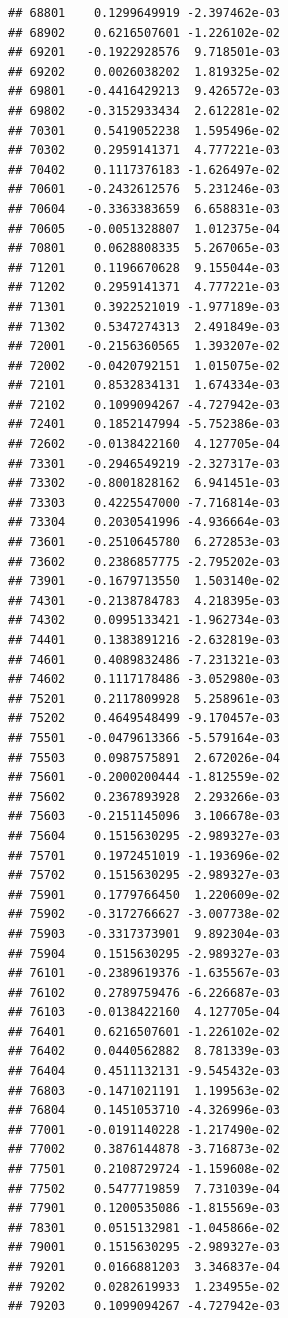 \documentclass[ignorenonframetext,]{beamer}
\begin{document}
\begin{frame}[fragile]
\begin{verbatim}
## 68801    0.1299649919 -2.397462e-03
## 68902    0.6216507601 -1.226102e-02
## 69201   -0.1922928576  9.718501e-03
## 69202    0.0026038202  1.819325e-02
## 69801   -0.4416429213  9.426572e-03
## 69802   -0.3152933434  2.612281e-02
## 70301    0.5419052238  1.595496e-02
## 70302    0.2959141371  4.777221e-03
## 70402    0.1117376183 -1.626497e-02
## 70601   -0.2432612576  5.231246e-03
## 70604   -0.3363383659  6.658831e-03
## 70605   -0.0051328807  1.012375e-04
## 70801    0.0628808335  5.267065e-03
## 71201    0.1196670628  9.155044e-03
## 71202    0.2959141371  4.777221e-03
## 71301    0.3922521019 -1.977189e-03
## 71302    0.5347274313  2.491849e-03
## 72001   -0.2156360565  1.393207e-02
## 72002   -0.0420792151  1.015075e-02
## 72101    0.8532834131  1.674334e-03
## 72102    0.1099094267 -4.727942e-03
## 72401    0.1852147994 -5.752386e-03
## 72602   -0.0138422160  4.127705e-04
## 73301   -0.2946549219 -2.327317e-03
## 73302   -0.8001828162  6.941451e-03
## 73303    0.4225547000 -7.716814e-03
## 73304    0.2030541996 -4.936664e-03
## 73601   -0.2510645780  6.272853e-03
## 73602    0.2386857775 -2.795202e-03
## 73901   -0.1679713550  1.503140e-02
## 74301   -0.2138784783  4.218395e-03
## 74302    0.0995133421 -1.962734e-03
## 74401    0.1383891216 -2.632819e-03
## 74601    0.4089832486 -7.231321e-03
## 74602    0.1117178486 -3.052980e-03
## 75201    0.2117809928  5.258961e-03
## 75202    0.4649548499 -9.170457e-03
## 75501   -0.0479613366 -5.579164e-03
## 75503    0.0987575891  2.672026e-04
## 75601   -0.2000200444 -1.812559e-02
## 75602    0.2367893928  2.293266e-03
## 75603   -0.2151145096  3.106678e-03
## 75604    0.1515630295 -2.989327e-03
## 75701    0.1972451019 -1.193696e-02
## 75702    0.1515630295 -2.989327e-03
## 75901    0.1779766450  1.220609e-02
## 75902   -0.3172766627 -3.007738e-02
## 75903   -0.3317373901  9.892304e-03
## 75904    0.1515630295 -2.989327e-03
## 76101   -0.2389619376 -1.635567e-03
## 76102    0.2789759476 -6.226687e-03
## 76103   -0.0138422160  4.127705e-04
## 76401    0.6216507601 -1.226102e-02
## 76402    0.0440562882  8.781339e-03
## 76404    0.4511132131 -9.545432e-03
## 76803   -0.1471021191  1.199563e-02
## 76804    0.1451053710 -4.326996e-03
## 77001   -0.0191140228 -1.217490e-02
## 77002    0.3876144878 -3.716873e-02
## 77501    0.2108729724 -1.159608e-02
## 77502    0.5477719859  7.731039e-04
## 77901    0.1200535086 -1.815569e-03
## 78301    0.0515132981 -1.045866e-02
## 79001    0.1515630295 -2.989327e-03
## 79201    0.0166881203  3.346837e-04
## 79202    0.0282619933  1.234955e-02
## 79203    0.1099094267 -4.727942e-03

\end{verbatim}
\end{frame}
\end{document}

